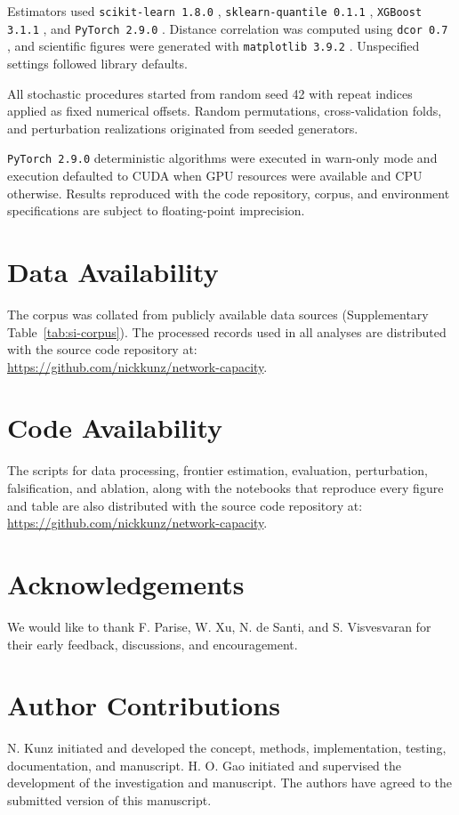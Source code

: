 \documentclass{article}
\begin{document}
Estimators used \texttt{scikit-learn 1.8.0} \citep{ref72,ref94}, \texttt{sklearn-quantile 0.1.1} \citep{ref87}, \texttt{XGBoost 3.1.1} \citep{ref39,ref95}, and \texttt{PyTorch 2.9.0} \citep{ref85,ref115}. Distance correlation was computed using \texttt{dcor 0.7} \citep{ref88}, and scientific figures were generated with \texttt{matplotlib 3.9.2} \citep{ref92,ref101}. Unspecified settings followed library defaults.

All stochastic procedures started from random seed 42 with repeat indices applied as fixed numerical offsets. Random permutations, cross-validation folds, and perturbation realizations originated from seeded generators. 

\texttt{PyTorch 2.9.0} deterministic algorithms were executed in warn-only mode and execution defaulted to CUDA when GPU resources were available and CPU otherwise. Results reproduced with the code repository, corpus, and environment specifications are subject to floating-point imprecision.
\clearpage

\section*{Data Availability}
\label{sec:data}
The corpus was collated from publicly available data sources (Supplementary Table~\ref{tab:si-corpus}). The processed records used in all analyses are distributed with the source code repository at: \\
\url{https://github.com/nickkunz/network-capacity}.

\section*{Code Availability}
\label{sec:code}
The scripts for data processing, frontier estimation, evaluation, perturbation, falsification, and ablation, along with the notebooks that reproduce every figure and table are also distributed with the source code repository at: \url{https://github.com/nickkunz/network-capacity}.

\section*{Acknowledgements}
\label{sec:acknowledge}
We would like to thank F. Parise, W. Xu, N. de Santi, and S. Visvesvaran for their early feedback, discussions, and encouragement.

\section*{Author Contributions}
\label{sec:authors}
N. Kunz initiated and developed the concept, methods, implementation, testing, documentation, and manuscript. H. O. Gao initiated and supervised the development of the investigation and manuscript. The authors have agreed to the submitted version of this manuscript.
\end{document}
